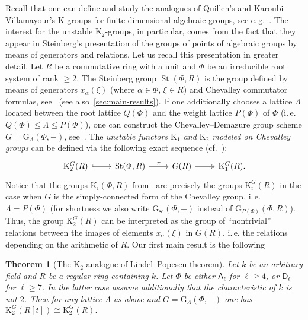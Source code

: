 \documentclass[oneside, 11pt]{amsart} \pdfoutput=1
\newcommand{\K}{{\mathrm{K}}}
\newcommand{\St}{\mathop{\mathrm{St}}\nolimits}
\newcommand{\Gsc}{\mathrm{G}_\mathrm{sc}}
\numberwithin{equation}{section}
\newtheorem{theorem}[lemma]{Theorem}
\theoremstyle{definition}
\newcommand{\rA}{\mathsf{A}}
\newcommand{\rD}{\mathsf{D}}
\begin{document}
Recall that one can define and study the analogues of Quillen's and Karoubi--Villamayour's $\K$-groups for finite-dimensional algebraic groups, see e.\,g.~\cite{St71, Re75, St78, Su82, Tu83, Abe83, Jar83, Pa89, Sta14, VW16, Sta20}. The interest for the unstable $\K_2$-groups, in particular, comes from the fact that they appear in Steinberg's presentation of the groups of points of algebraic groups by means of generators and relations. Let us recall this presentation in greater detail. Let $R$ be a commutative ring with a unit and $\Phi$ be an irreducible root system of rank $\geq 2$. The Steinberg group $\St(\Phi, R)$ is the group defined by means of generators $x_\alpha(\xi)$ (where $\alpha\in\Phi$, $\xi\in R$) and Chevalley commutator formulas, see~\cite[Ch.~6]{St67} (see also~\cref{sec:main-results}).
If one additionally chooses a lattice $\Lambda$ located between the root lattice $Q(\Phi)$ and the weight lattice $P(\Phi)$ of $\Phi$ (i.\,e. $Q(\Phi) \leq \Lambda \leq P(\Phi)$), one can construct the Chevalley--Demazure group scheme $G = \mathrm{G}_\Lambda(\Phi, -)$, see~\cite[\S~3]{St67}. The {\it unstable functors $\K_1$ and $\K_2$ modeled on Chevalley groups} can be defined via the following exact sequence (cf.~\cite{St78}):
\begin{equation} \label{eq:main-exactSeq} \begin{tikzcd} \K_2^G(R) \ar[hookrightarrow]{r} & \St(\Phi, R) \ar{r}{\pi} & G(R) \ar[twoheadrightarrow]{r} & \K_1^G(R). \end{tikzcd} \end{equation}
Notice that the groups $\K_i(\Phi, R)$ from~\cite{St78} are precisely the groups $\K_i^G(R)$ in the case when $G$ is the simply-connected form of the Chevalley group, i.\,e. $\Lambda = P(\Phi)$ (for shortness we also write $\Gsc(\Phi,-)$ instead of $\mathrm{G}_{P(\Phi)}(\Phi, R)$). 
Thus, the group $\K_2^G(R)$ can be interpreted as the group of ``nontrivial'' relations between the images of elements $x_\alpha(\xi)$ in $G(R)$, i.\,e. the relations depending on the arithmetic of $R$. Our first main result is the following
\begin{theorem}[The $\K_2$-analogue of Lindel--Popescu theorem] \label{theorem:LP-for-K2}
Let $k$ be an arbitrary field and $R$ be a regular ring containing $k$. Let $\Phi$ be either $\rA_\ell$ for $\ell\geq4$, or $\rD_\ell$ for $\ell\geq 7$. In the latter case assume additionally that the characteristic of $k$ is not $2$. Then for any lattice $\Lambda$ as above and $G = \mathrm{G}_\Lambda(\Phi, -)$ one has $\K_2^G(R[t])\cong\K_2^G(R).$
\end{theorem} 
\end{document}
